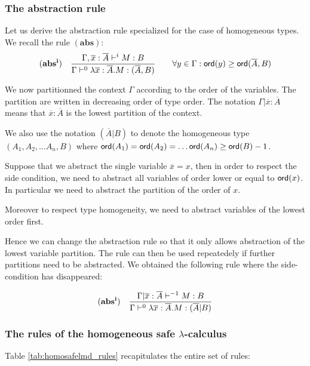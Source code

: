 \subsubsection{The abstraction rule}

Let us derive the abstraction rule specialized for the case of
homogeneous types. We recall the rule $\mathbf{(abs)}$:
$$ \mathbf{(abs^i)} \quad  \frac{\displaystyle \Gamma, \overline{x} : \overline{A} \vdash^{i} M : B}{\Gamma  \vdash^{0} \lambda \overline{x} : \overline{A} . M : (\overline{A},B)} \qquad
                                   \forall y \in \Gamma : {\sf ord}(y) \geq {\sf ord}(\overline{A},B)$$

We now partitionned the context $\Gamma$ according to the order of
the variables. The partition are written in decreasing order of type
order. The notation $\Gamma | \overline{x}:\overline{A}$ means that
$\overline{x}:\overline{A}$ is the lowest partition of the context.

We also use the notation $(\overline{A}|B)$ to denote the
homogeneous type $(A_1, A_2, \ldots A_n, B)$ where ${\sf ord}(A_1) =
{\sf ord}(A_2) =  \ldots {\sf ord}(A_n) \geq {\sf ord}(B) -1$.


Suppose that we abstract the single variable $\overline{x} = x$,
then in order to respect the side condition, we need to abstract all
variables of order lower or equal to ${\sf ord}(x)$. In particular we
need to abstract the partition of the order of $x$.

Moreover to respect type homogeneity, we need to abstract variables
of the lowest order first.

Hence we can change the abstraction rule so that it only allows
abstraction of the lowest variable partition. The rule can then be
used repeatedely if further partitions need to be abstracted. We
obtained the following rule where the side-condition has
disappeared:

$$ \mathbf{(abs^i)} \quad  \frac{\displaystyle \Gamma| \overline{x} : \overline{A} \vdash^{-1} M : B}{\Gamma  \vdash^{0} \lambda \overline{x} : \overline{A} . M : (\overline{A}|B)}$$


\subsubsection{The rules of the homogeneous safe $\lambda$-calculus}

Table \ref{tab:homosafelmd_rules} recapitulates the entire set of rules:

